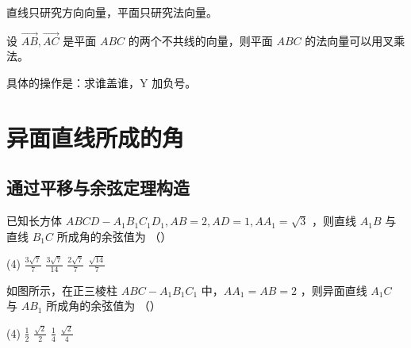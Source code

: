 \begin{tips}
    直线只研究方向向量，平面只研究法向量。
\end{tips}

\begin{theorem}[叉乘法求法向量]
    设 $\overrightarrow{A B}, \overrightarrow{A C}$ 是平面 $A B C$ 的两个不共线的向量，则平面 $A B C$ 的法向量可以用叉乘法。

    具体的操作是：求谁盖谁，Y 加负号。
\end{theorem}

\section{异面直线所成的角}

\subsection{通过平移与余弦定理构造}

\begin{example}
    已知长方体 $A B C D-A_1 B_1 C_1 D_1, A B=2, A D=1, A A_1=\sqrt{3}$ ，则直线 $A_1 B$ 与直线 $B_1 C$ 所成角的余弦值为 （\qquad）
    \begin{tasks}(4)
        \task $\frac{3 \sqrt{7}}{7}$
        \task $\frac{3 \sqrt{7}}{14}$
        \task $\frac{2 \sqrt{7}}{7}$
        \task $\frac{\sqrt{14}}{7}$
    \end{tasks}
\end{example}

\begin{figure} [H]
    \resizebox{0.16\textwidth}{!}{}
\end{figure}

\begin{example}
    如图所示，在正三棱柱 $A B C-A_1 B_1 C_1$ 中，$A A_1=A B=2$ ，则异面直线 $A_1 C$ 与 $A B_1$ 所成角的余弦值为 （\qquad）
    \begin{tasks}(4)
        \task $\frac{1}{2}$
        \task $\frac{\sqrt{2}}{2}$
        \task $\frac{1}{4}$
        \task $\frac{\sqrt{2}}{4}$
    \end{tasks}
\end{example}

\begin{figure} [H]
    \resizebox{0.16\textwidth}{!}{}
\end{figure}

